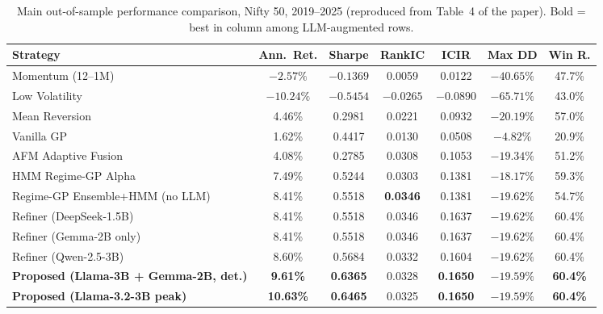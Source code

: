 \documentclass[11pt,a4paper]{article}
\begin{document}
\begin{table}[H]
\centering\small
\caption{Main out-of-sample performance comparison, Nifty 50, 2019--2025
(reproduced from Table~4 of the paper). Bold = best in column among
LLM-augmented rows.}
\label{tab:main}
\begin{tabular}{@{}lcccccc@{}}
\toprule
\textbf{Strategy} & \textbf{Ann.\ Ret.} & \textbf{Sharpe} &
\textbf{RankIC} & \textbf{ICIR} & \textbf{Max DD} & \textbf{Win R.} \\
\midrule
Momentum (12--1M)      & $-2.57\%$  & $-0.1369$ & 0.0059  & 0.0122  & $-40.65\%$ & 47.7\% \\
Low Volatility         & $-10.24\%$ & $-0.5454$ & $-0.0265$ & $-0.0890$ & $-65.71\%$ & 43.0\% \\
Mean Reversion         & 4.46\%     & 0.2981    & 0.0221  & 0.0932  & $-20.19\%$ & 57.0\% \\
Vanilla GP             & 1.62\%     & 0.4417    & 0.0130  & 0.0508  & $-4.82\%$  & 20.9\% \\
AFM Adaptive Fusion    & 4.08\%     & 0.2785    & 0.0308  & 0.1053  & $-19.34\%$ & 51.2\% \\
HMM Regime-GP Alpha    & 7.49\%     & 0.5244    & 0.0303  & 0.1381  & $-18.17\%$ & 59.3\% \\
\midrule
Regime-GP Ensemble+HMM (no LLM) & 8.41\% & 0.5518 & \textbf{0.0346} & 0.1381 & $-19.62\%$ & 54.7\% \\
Refiner (DeepSeek-1.5B)          & 8.41\%  & 0.5518 & 0.0346 & 0.1637 & $-19.62\%$ & 60.4\% \\
Refiner (Gemma-2B only)          & 8.41\%  & 0.5518 & 0.0346 & 0.1637 & $-19.62\%$ & 60.4\% \\
Refiner (Qwen-2.5-3B)            & 8.60\%  & 0.5684 & 0.0332 & 0.1604 & $-19.62\%$ & 60.4\% \\
\textbf{Proposed (Llama-3B + Gemma-2B, det.)} &
  \textbf{9.61\%} & \textbf{0.6365} & 0.0328 & \textbf{0.1650} &
  $-19.59\%$ & \textbf{60.4\%} \\
\textbf{Proposed (Llama-3.2-3B peak)} &
  \textbf{10.63\%} & \textbf{0.6465} & 0.0325 & \textbf{0.1650} &
  $-19.59\%$ & \textbf{60.4\%} \\
\bottomrule
\end{tabular}
\end{table}
\end{document}
